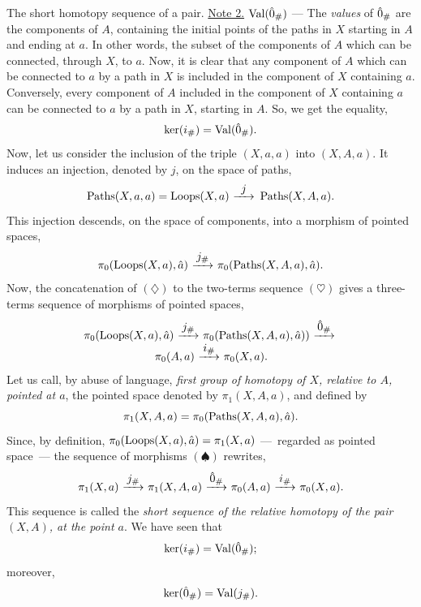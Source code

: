 \begin{Article}{The short homotopy sequence of a pair.}{}
  \uline{Note 2.} $\operatorname{Val}(\hat 0_\#)$ --- The {\em values} of $\hat 0_\#$ are the components of $A$,
  containing the initial points of the paths in $X$ starting in $A$ and ending at $a$.
  In other words,
  the subset of the components of $A$ which can be connected,
  through $X$,
  to $a$.
  Now,
  it is clear that any component of $A$ which can be connected to $a$ by a path in $X$ is included in the component of $X$ containing $a$.
  Conversely,
  every component of $A$ included in the component of $X$ containing $a$ can be connected to $a$ by a path in $X$,
  starting in $A$. So, we get the equality,
  $$%
  \ker(i_\#) = \Val(\0_\#).
  $$%
  Now,
  let us consider the inclusion of the triple $(X,a,a)$ into $(X,A,a)$.
  It induces an injection,
  denoted by $j$,
  on the space of paths,
  $$%
  \Paths(X,a,a) = \Loops(X,a) \rfl{j} \Paths(X,A,a).
  $$%
  This injection descends,
  on the space of components,
  into a morphism of pointed spaces,
  \begin{equation}
    \renewcommand{\theequation}{$\diamondsuit$}
    \pi_0(\Loops(X,a),\hat a) \rfl{j_\#} \pi_0(\Paths(X,A,a), \hat a).
  \end{equation}
  Now,
  the concatenation of $(\diamondsuit)$ to the two-terms sequence $(\heartsuit)$ gives a three-terms sequence of morphisms of pointed spaces,
  \begin{equation} \renewcommand{\theequation}{$\spadesuit$}
    \begin{array}{c}
    \pi_0(\Loops(X,a),\hat a)  \rfl{j_\#}  \pi_0(\Paths(X,A,a),\hat a))  \rfl{\0_\#} \\
    \pi_0(A,a)  \rfl{i_\#} \pi_0(X,a).
    \end{array}
  \end{equation}
  Let us call,
  by abuse of language,
  {\em first group of homotopy of $X$,
  relative to $A$,
  pointed at $a$},
  the pointed space denoted by $\pi_1(X,A,a)$,
  and defined by
  $$%
  \pi_1(X,A,a) = \pi_0(\Paths(X,A,a), \hat a).
  $$%
  Since,
  by definition,
  $\pi_0(\operatorname{Loops}(X,a),\hat a) = \pi_1(X,a)$
  ---~regarded as pointed space~---
  the sequence of morphisms $(\spadesuit)$ rewrites,
  \begin{equation}
    \renewcommand{\theequation}{$\clubsuit$}
    \pi_1(X,a) \rfl{j_\#}
    \pi_1(X,A,a) \rfl{\0_\#}
    \pi_0(A,a) \rfl{i_\#} \pi_0(X,a).
  \end{equation}
  This sequence is called the {\em short sequence of the relative homotopy of the pair $(X,A)$,
  at the point $a$}.
  We have seen that
  $$%
  \ker(i_\#) = \Val(\0_\#);
  $$%
  moreover,
  $$%
  \ker(\0_\#) = \Val(j_\#).
  $$%


\end{Article}
